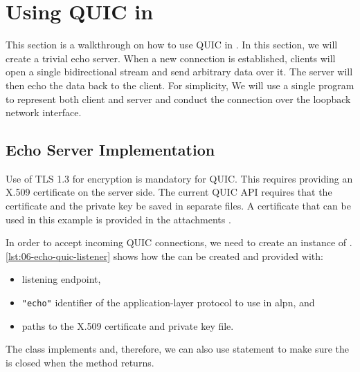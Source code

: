 \section{Using QUIC in \dotnet{}}

This section is a walkthrough on how to use QUIC in \dotnet{}. In this section, we will create a
trivial echo server. When a new connection is established, clients will open a single bidirectional
stream and send arbitrary data over it. The server will then echo the data back to the client. For
simplicity, We will use a single \dotnet{} program to represent both client and server and conduct
the connection over the loopback network interface.

\subsection{Echo Server Implementation}

Use of TLS 1.3 for encryption is mandatory for QUIC. This requires providing an X.509 certificate on
the server side. The current QUIC API requires that the certificate and the private key be saved in
separate files. A certificate that can be used in this example is provided in the attachments
. 

In order to accept incoming QUIC connections, we need to create an instance of \QuicListener{}.
\autoref{lst:06-echo-quic-listener} shows how the \QuicListener{} can be created and provided with:

\begin{itemize}

  \item listening endpoint,

  \item \texttt{"echo"} identifier of the application-layer protocol to use in \gls{alpn}, and

  \item paths to the X.509 certificate and private key file.

\end{itemize}

The \QuicListener{} class implements  and, therefore, we can also use
 statement to make sure the \QuicListener{} is closed when the method returns.

